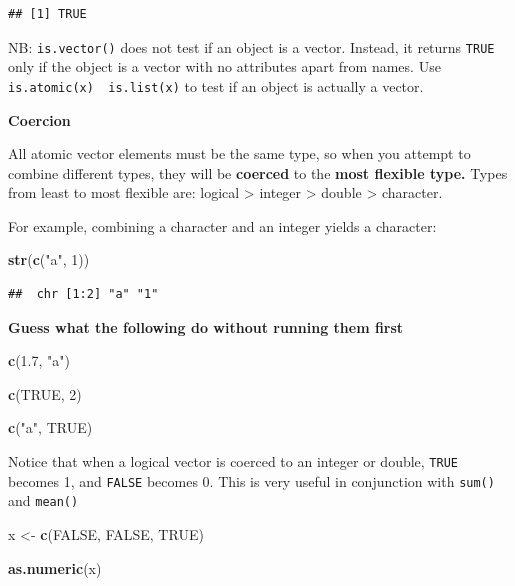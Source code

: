 \documentclass[
]{book}
\newenvironment{Shaded}{\begin{snugshade}}{\end{snugshade}}
\newcommand{\ConstantTok}[1]{\textcolor[rgb]{0.56,0.35,0.01}{#1}}
\newcommand{\DecValTok}[1]{\textcolor[rgb]{0.00,0.00,0.81}{#1}}
\newcommand{\FloatTok}[1]{\textcolor[rgb]{0.00,0.00,0.81}{#1}}
\newcommand{\FunctionTok}[1]{\textcolor[rgb]{0.13,0.29,0.53}{\textbf{#1}}}
\newcommand{\NormalTok}[1]{#1}
\newcommand{\OtherTok}[1]{\textcolor[rgb]{0.56,0.35,0.01}{#1}}
\newcommand{\StringTok}[1]{\textcolor[rgb]{0.31,0.60,0.02}{#1}}
\begin{document}
\begin{verbatim}
## [1] TRUE
\end{verbatim}

NB: \texttt{is.vector()} does not test if an object is a vector. Instead, it returns \texttt{TRUE} only if the object is a vector with no attributes apart from names. Use \texttt{is.atomic(x)\ \textbar{}\textbar{}\ is.list(x)} to test if an object is actually a vector.

\textbf{Coercion}

All atomic vector elements must be the same type, so when you attempt to combine different types, they will be \textbf{coerced} to the \textbf{most flexible type.} Types from least to most flexible are: logical \textgreater{} integer \textgreater{} double \textgreater{} character.

For example, combining a character and an integer yields a character:

\begin{Shaded}
\begin{Highlighting}[]
\FunctionTok{str}\NormalTok{(}\FunctionTok{c}\NormalTok{(}\StringTok{"a"}\NormalTok{, }\DecValTok{1}\NormalTok{))}
\end{Highlighting}
\end{Shaded}

\begin{verbatim}
##  chr [1:2] "a" "1"
\end{verbatim}

\textbf{Guess what the following do without running them first}

\begin{Shaded}
\begin{Highlighting}[]
\FunctionTok{c}\NormalTok{(}\FloatTok{1.7}\NormalTok{, }\StringTok{"a"}\NormalTok{)}

\FunctionTok{c}\NormalTok{(}\ConstantTok{TRUE}\NormalTok{, }\DecValTok{2}\NormalTok{)}

\FunctionTok{c}\NormalTok{(}\StringTok{"a"}\NormalTok{, }\ConstantTok{TRUE}\NormalTok{)}
\end{Highlighting}
\end{Shaded}

Notice that when a logical vector is coerced to an integer or double, \texttt{TRUE} becomes 1, and \texttt{FALSE} becomes 0. This is very useful in conjunction with \texttt{sum()} and \texttt{mean()}

\begin{Shaded}
\begin{Highlighting}[]
\NormalTok{x }\OtherTok{\textless{}{-}} \FunctionTok{c}\NormalTok{(}\ConstantTok{FALSE}\NormalTok{, }\ConstantTok{FALSE}\NormalTok{, }\ConstantTok{TRUE}\NormalTok{)}

\FunctionTok{as.numeric}\NormalTok{(x)}
\end{Highlighting}
\end{Shaded}
\end{document}
